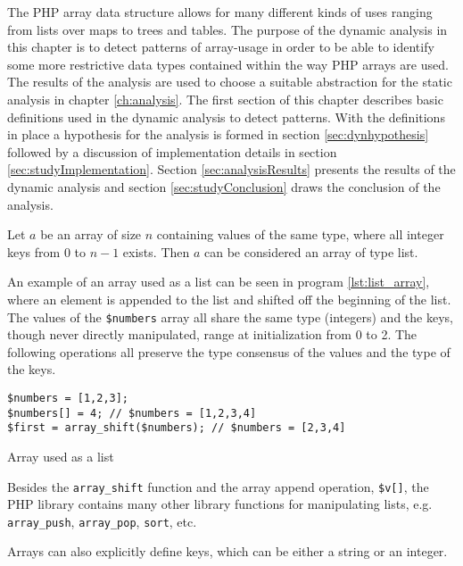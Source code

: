 The PHP array data structure allows for many different kinds of uses ranging from lists over maps to trees and tables. The purpose of the dynamic analysis in this chapter is to detect patterns of array-usage in order to be able to identify some more restrictive data types contained within the way PHP arrays are used. The results of the analysis are used to choose a suitable abstraction for the static analysis in chapter \ref{ch:analysis}. The first section of this chapter describes basic definitions used in the dynamic analysis to detect patterns. With the definitions in place a hypothesis for the analysis is formed in section \ref{sec:dynhypothesis} followed by a discussion of implementation details in section \ref{sec:studyImplementation}. Section \ref{sec:analysisResults} presents the results of the dynamic analysis and section \ref{sec:studyConclusion} draws the conclusion of the analysis.

\begin{definition}
\label{def:list}
Let $a$ be an array of size $n$ containing values of the same type, where all integer keys from 0 to $n-1$ exists. Then $a$ can be considered an array of type list.
\end{definition}

An example of an array used as a list can be seen in program \ref{lst:list_array}, where an element is appended to the list and shifted off the beginning of the list. The values of the \texttt{\$numbers} array all share the same type (integers) and the keys, though never directly manipulated, range at initialization from 0 to 2. The following operations all preserve the type consensus of the values and the type of the keys. 

\begin{program}[ht]
\begin{lstlisting}
$numbers = [1,2,3];
$numbers[] = 4; // $numbers = [1,2,3,4]
$first = array_shift($numbers); // $numbers = [2,3,4]
\end{lstlisting}
\caption{Array used as a list}
\label{lst:list_array}
\end{program}

Besides the \texttt{array\_shift} function and the array append operation, \texttt{\$v[]}, the PHP library contains many other library functions for manipulating lists, e.g. \texttt{array\_push}, \texttt{array\_pop}, \texttt{sort}, etc.

Arrays can also explicitly define keys, which can be either a string or an integer. 

